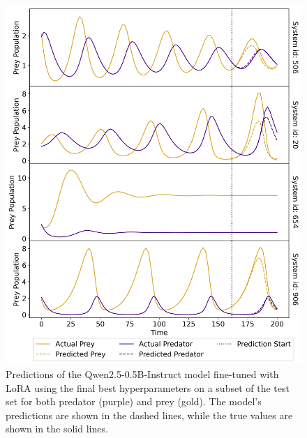 \documentclass[11pt,a4paper]{article}
\begin{document}
\begin{figure}
    \centering
    \includegraphics[width=\columnwidth, keepaspectratio]{../plots/predictions_lora_final.png}
    \caption{Predictions of the Qwen2.5-0.5B-Instruct model fine-tuned with LoRA using the final best hyperparameters on a subset of the test set for both predator (purple) and prey (gold). The model's predictions are shown in the dashed lines, while the true values are shown in the solid lines.}
    \label{fig:lora_final_pred}
\end{figure}
\end{document}
